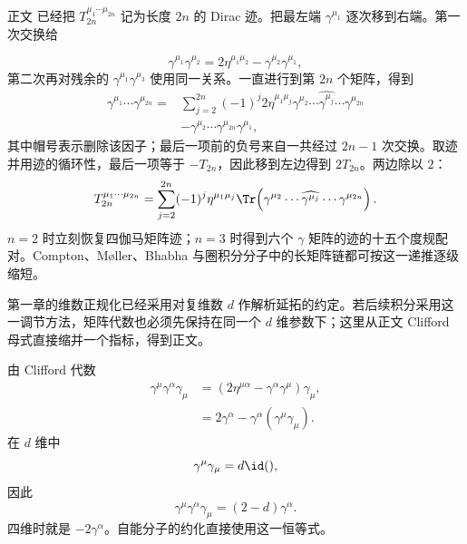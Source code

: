\begin{derivation}
正文 已经把 $T_{2n}^{\mu_1\cdots\mu_{2n}}$ 记为长度 $2n$ 的 Dirac 迹。把最左端 $\gamma^{\mu_1}$ 逐次移到右端。第一次交换给

\begin{equation*}
 \gamma^{\mu_1}\gamma^{\mu_2}
 =2\eta^{\mu_1\mu_2}-\gamma^{\mu_2}\gamma^{\mu_1},
\end{equation*}
第二次再对残余的 $\gamma^{\mu_1}\gamma^{\mu_3}$ 使用同一关系。一直进行到第 $2n$ 个矩阵，得到
\begin{align*}
 \gamma^{\mu_1}\cdots\gamma^{\mu_{2n}}
 =&\sum_{j=2}^{2n}(-1)^j 2\eta^{\mu_1\mu_j}
 \gamma^{\mu_2}\cdots\widehat{\gamma^{\mu_j}}\cdots\gamma^{\mu_{2n}}
 \nonumber\\
 &-\gamma^{\mu_2}\cdots\gamma^{\mu_{2n}}\gamma^{\mu_1},
 \end{align*}
其中帽号表示删除该因子；最后一项前的负号来自一共经过 $2n-1$ 次交换。取迹并用迹的循环性，最后一项等于 $-T_{2n}$，因此移到左边得到 $2T_{2n}$。两边除以 $2$：
\begin{equation*}
 {
 T_{2n}^{\mu_1\cdots\mu_{2n}}
 =\sum_{j=2}^{2n}(-1)^j
 \eta^{\mu_1\mu_j}
 \Tr\!\left(
 \gamma^{\mu_2}\cdots\widehat{\gamma^{\mu_j}}\cdots\gamma^{\mu_{2n}}
 \right).}
 \end{equation*}
$n=2$ 时立刻恢复四伽马矩阵迹；$n=3$ 时得到六个 $\gamma$ 矩阵的迹的十五个度规配对。Compton、M\o ller、Bhabha 与圈积分分子中的长矩阵链都可按这一递推逐级缩短。
\end{derivation}



\begin{derivation}

第一章的维数正规化已经采用对复维数 $d$ 作解析延拓的约定。若后续积分采用这一调节方法，矩阵代数也必须先保持在同一个 $d$ 维参数下；这里从正文 Clifford 母式直接缩并一个指标，得到正文。



由 Clifford 代数
\begin{align*}
 \gamma^\mu\gamma^\alpha\gamma_\mu
 &=(2\eta^{\mu\alpha}-\gamma^\alpha\gamma^\mu)\gamma_\mu,\\
 &=2\gamma^\alpha-\gamma^\alpha(\gamma^\mu\gamma_\mu).
\end{align*}
在 $d$ 维中
\begin{equation*}
 \gamma^\mu\gamma_\mu=d\id(),
\end{equation*}
因此
\begin{equation*}
 {
 \gamma^\mu\gamma^\alpha\gamma_\mu=(2-d)\gamma^\alpha.}
 \end{equation*}
四维时就是 $-2\gamma^\alpha$。自能分子的约化直接使用这一恒等式。
\end{derivation}

